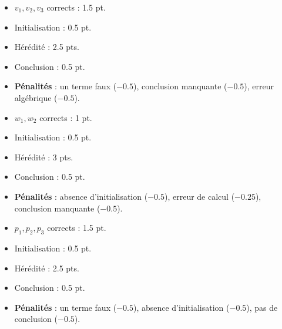 \documentclass[14pt, a4paper]{extarticle}
\begin{document}
\begin{tcolorbox}[title=Exercice 2 (5 points)]
\begin{itemize}
    \item $v_1, v_2, v_3$ corrects : 1.5 pt.
    \item Initialisation : 0.5 pt.
    \item Hérédité : 2.5 pts.
    \item Conclusion : 0.5 pt.
    \item \textbf{Pénalités} : un terme faux ($-0.5$), conclusion manquante ($-0.5$), erreur algébrique ($-0.5$).
\end{itemize}
\end{tcolorbox}

\begin{tcolorbox}[title=Exercice 3 (5 points)]
\begin{itemize}
    \item $w_1, w_2$ corrects : 1 pt.
    \item Initialisation : 0.5 pt.
    \item Hérédité : 3 pts.
    \item Conclusion : 0.5 pt.
    \item \textbf{Pénalités} : absence d’initialisation ($-0.5$), erreur de calcul ($-0.25$), conclusion manquante ($-0.5$).
\end{itemize}
\end{tcolorbox}

\begin{tcolorbox}[title=Exercice 4 (5 points)]
\begin{itemize}
    \item $p_1, p_2, p_3$ corrects : 1.5 pt.
    \item Initialisation : 0.5 pt.
    \item Hérédité : 2.5 pts.
    \item Conclusion : 0.5 pt.
    \item \textbf{Pénalités} : un terme faux ($-0.5$), absence d’initialisation ($-0.5$), pas de conclusion ($-0.5$).
\end{itemize}
\end{tcolorbox}
\end{document}
